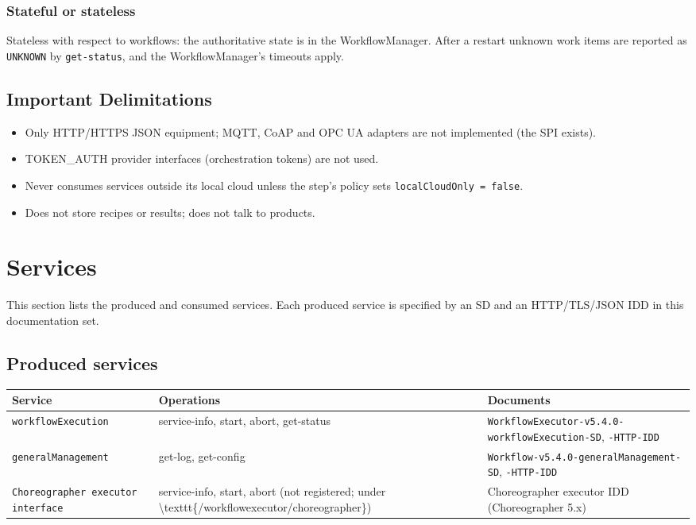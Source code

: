 \documentclass[a4paper]{arrowhead}
\begin{document}
\subsubsection{Stateful or stateless}
Stateless with respect to workflows: the authoritative state is in the WorkflowManager. After a restart
unknown work items are reported as \texttt{UNKNOWN} by \texttt{get-status}, and the WorkflowManager's timeouts apply.

\subsection{Important Delimitations}
\label{sec:delimitations}
\begin{itemize}
\item Only HTTP/HTTPS JSON equipment; MQTT, CoAP and OPC UA adapters are not implemented (the SPI exists).
\item TOKEN\_AUTH provider interfaces (orchestration tokens) are not used.
\item Never consumes services outside its local cloud unless the step's policy sets \texttt{localCloudOnly = false}.
\item Does not store recipes or results; does not talk to products.
\end{itemize}

\newpage
\section{Services}
\label{sec:services}
This section lists the produced and consumed services. Each produced service is specified by an SD and an HTTP/TLS/JSON
IDD in this documentation set.

\subsection{Produced services}

{\small
\begin{longtable}{|p{3.8cm}|p{6.2cm}|p{5.8cm}|}

\hline
\rowcolor{gray!33} Service & Operations & Documents \\ \hline
\endhead
\texttt{workflowExecution} & service-info, start, abort, get-status & \texttt{WorkflowExecutor-v5.4.0-workflowExecution-SD}, \texttt{-HTTP-IDD} \\ \hline
\texttt{generalManagement} & get-log, get-config & \texttt{Workflow-v5.4.0-generalManagement-SD}, \texttt{-HTTP-IDD} \\ \hline
\texttt{Choreographer executor interface} & service-info, start, abort (not registered; under \textbackslash{}texttt\{/workflowexecutor/choreographer\}) & Choreographer executor IDD (Choreographer 5.x) \\ \hline
\end{longtable}
}
\end{document}
